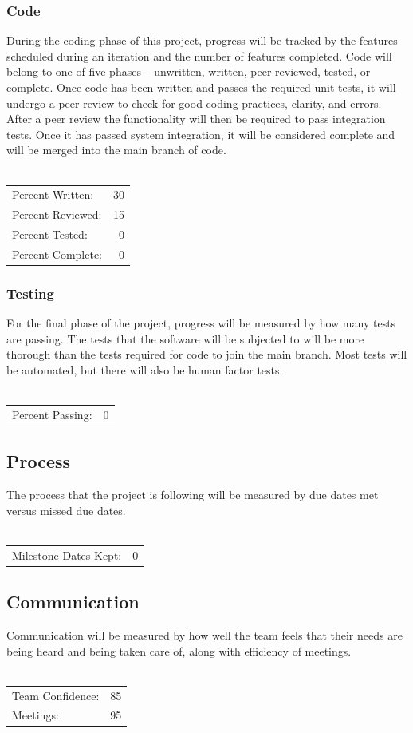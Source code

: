 \documentclass{article}
\begin{document}
\subsubsection{Code}
During the coding phase of this project, progress will be tracked by the features scheduled during an iteration and the number of features completed. Code will belong to one of five phases – unwritten, written, peer reviewed, tested, or complete. Once code has been written and passes the required unit tests, it will undergo a peer review to check for good coding practices, clarity, and errors. After a peer review the functionality will then be required to pass integration tests. Once it has passed system integration, it will be considered complete and will be merged into the main branch of code.\\ \\
\begin{tabular}{l r}
Percent Written: & 30 \\
Percent Reviewed: & 15 \\
Percent Tested: & 0 \\
Percent Complete: & 0 \\
\end{tabular}
\subsubsection{Testing}
For the final phase of the project, progress will be measured by how many tests are passing. The tests that the software will be subjected to will be more thorough than the tests required for code to join the main branch. Most tests will be automated, but there will also be human factor tests.\\ \\
\begin{tabular}{l r}
Percent Passing: & 0 \\
\end{tabular}
\subsection{Process}
The process that the project is following will be measured by due dates met versus missed due dates.\\ \\
\begin{tabular}{l r}
Milestone Dates Kept: & 0 \\
\end{tabular}

\subsection{Communication}
Communication will be measured by how well the team feels that their needs are being heard and being taken care of, along with efficiency of meetings.\\ \\
\begin{tabular}{l r}
Team Confidence: & 85 \\
Meetings: & 95 \\
\end{tabular}
\end{document}
